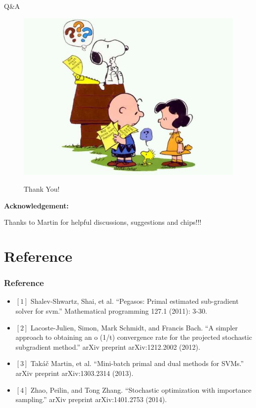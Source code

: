 \begin{frame}{Q\&A}

\begin{figure}[htbp]
    \begin{multicols}{2}
    \includegraphics[height=0.4\textheight]{images/question.jpg}

    \Huge{Thank You!}
    \end{multicols}
\end{figure}

\textbf{Acknowledgement:}

Thanks to Martin for helpful discussions, suggestions and chips!!!

\end{frame}

\section{Reference}
\begin{frame}[fragile]
\frametitle{Reference}
\begin{itemize}
\item[] $\left[1\right]$ Shalev-Shwartz, Shai, et al. ``Pegasos: Primal estimated sub-gradient solver for svm.'' Mathematical programming 127.1 (2011): 3-30. 

\item[] $\left[2\right]$ Lacoste-Julien, Simon, Mark Schmidt, and Francis Bach. ``A simpler approach to obtaining an o (1/t) convergence rate for the projected stochastic subgradient method.'' arXiv preprint arXiv:1212.2002 (2012).

\item[] $\left[3\right]$  Tak\'a\v{c} Martin, et al. ``Mini-batch primal and dual methods for SVMs.'' arXiv preprint arXiv:1303.2314 (2013).
\item[] $\left[4\right]$ Zhao, Peilin, and Tong Zhang. ``Stochastic optimization with importance sampling.'' arXiv preprint arXiv:1401.2753 (2014).
\end{itemize}
\end{frame}

